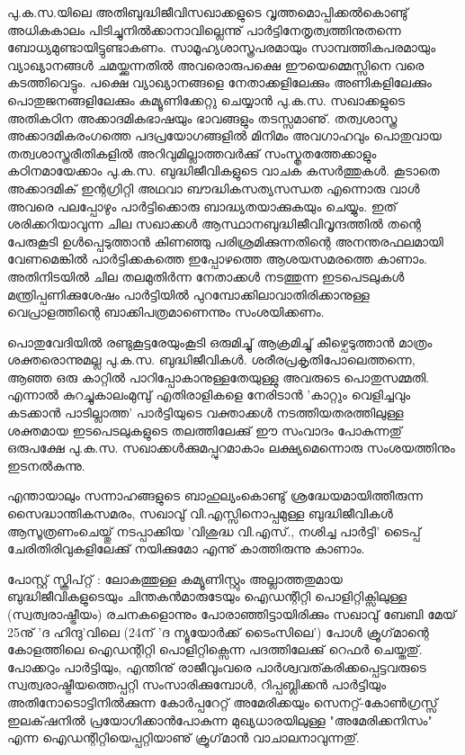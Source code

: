പു.ക.സ.യിലെ അതിബുദ്ധിജീവിസഖാക്കളുടെ വൃത്തമൊപ്പിക്കല്‍കൊണ്ടു് അധികകാലം പിടിച്ചുനില്‍ക്കാനാവില്ലെന്നു് 
പാര്‍ട്ടിനേതൃത്വത്തിനുതന്നെ ബോധ്യമുണ്ടായിട്ടുണ്ടാകണം. സാമൂഹ്യശാസ്ത്രപരമായും സാമ്പത്തികപരമായും 
വ്യാഖ്യാനങ്ങള്‍ ചമയ്ക്കുന്നതില്‍ അവരൊരുപക്ഷെ ഈയെമ്മെസ്സിനെ വരെ കടത്തിവെട്ടും. പക്ഷെ വ്യാഖ്യാനങ്ങളെ നേതാക്കളിലേക്കും 
അണികളിലേക്കും പൊതുജനങ്ങളിലേക്കും കമ്യൂണിക്കേറ്റു ചെയ്യാന്‍ പു.ക.സ. സഖാക്കളുടെ അതികഠിന അക്കാദമികഭാഷയും
ഭാവങ്ങളും തടസ്സമാണു്. തത്വശാസ്ത്ര അക്കാദമികരംഗത്തെ പദപ്രയോഗങ്ങളില്‍ മിനിമം അവഗാഹവും പൊതുവായ 
തത്വശാസ്ത്രരീതികളില്‍ അറിവുമില്ലാത്തവര്‍ക്കു് സംസ്കൃതത്തേക്കാളും കഠിനമായേക്കാം പു.ക.സ. ബുദ്ധിജീവികളുടെ വാചക
കസര്‍ത്തുകള്‍. കൂടാതെ അക്കാദമിക് ഇന്റഗ്രിറ്റി അഥവാ ബൗദ്ധികസത്യസന്ധത എന്നൊരു വാള്‍ അവരെ പലപ്പോഴും 
പാര്‍ട്ടിക്കൊരു ബാദ്ധ്യതയാക്കുകയും ചെയ്യും. ഇത് ശരിക്കറിയാവുന്ന ചില സഖാക്കള്‍ ആസ്ഥാനബുദ്ധിജീവിവൃന്ദത്തില്‍ 
തന്റെ പേരുകൂടി ഉള്‍പ്പെടുത്താന്‍ കിണഞ്ഞു പരിശ്രമിക്കുന്നതിന്റെ അനന്തരഫലമായി വേണമെങ്കില്‍ പാര്‍ട്ടിക്കകത്തെ ഇപ്പോഴത്തെ
ആശയസമരത്തെ കാണാം. അതിനിടയില്‍ ചില തലമുതിര്‍ന്ന നേതാക്കള്‍ നടത്തുന്ന ഇടപെടലുകള്‍ മന്ത്രിപ്പണിക്കുശേഷം
പാര്‍ട്ടിയില്‍ പുറമ്പോക്കിലാവാതിരിക്കാനുള്ള വെപ്രാളത്തിന്റെ ബാക്കിപത്രമാണെന്നും സംശയിക്കണം.

പൊതുവേദിയില്‍ രണ്ടുകൂട്ടരേയുംകൂടി ഒരുമിച്ചു് ആക്രമിച്ചു് കീഴ്പെടുത്താന്‍ മാത്രം ശക്തരൊന്നുമല്ല പു.ക.സ. ബുദ്ധിജീവികള്‍. 
ശരീരപ്രകൃതിപോലെത്തന്നെ, ആഞ്ഞ ഒരു കാറ്റില്‍ പാറിപ്പോകാനുള്ളതേയുള്ളു അവരുടെ പൊതുസമ്മതി. എന്നാല്‍ കുറച്ചുകാലംമുമ്പു് 
എതിരാളികളെ നേരിടാന്‍ 'കാറ്റും വെളിച്ചവും കടക്കാന്‍ പാടില്ലാത്ത' പാര്‍ട്ടിയുടെ വക്താക്കള്‍ 
നടത്തിയതരത്തിലുള്ള ശക്തമായ ഇടപെടലുകളുടെ തലത്തിലേക്കു് ഈ സംവാദം പോകുന്നതു് ഒരുപക്ഷേ പു.ക.സ. 
സഖാക്കള്‍ക്കുമപ്പുറമാകാം ലക്ഷ്യമെന്നൊരു സംശയത്തിനും ഇടനല്‍കുന്നു.

എന്തായാലും സന്നാഹങ്ങളുടെ ബാഹുല്യംകൊണ്ടു് ശ്രദ്ധേയമായിത്തീരുന്ന സൈദ്ധാന്തികസമരം, സഖാവു് വി.എസ്സിനൊപ്പമുള്ള 
ബുദ്ധിജീവികള്‍ ആസൂത്രണംചെയ്തു് നടപ്പാക്കിയ 'വിശുദ്ധ വി.എസ്., നശിച്ച പാര്‍ട്ടി' ടൈപ്പ് ചേരിതിരിവുകളിലേക്കു് 
നയിക്കുമോ എന്നു് കാത്തിരുന്നു കാണാം.

പോസ്റ്റ് സ്ക്രിപ്റ്റ് : ലോകത്തുള്ള കമ്യൂണിസ്റ്റും അല്ലാത്തതുമായ ബുദ്ധിജീവികളുടെയും ചിന്തകന്‍മാരുടേയും ഐഡന്റിറ്റി 
പൊളിറ്റിക്സിലുള്ള (സ്വത്വരാഷ്ട്രീയം) രചനകളൊന്നും പോരാഞ്ഞിട്ടായിരിക്കും സഖാവു് ബേബി മേയ് 25നു് 'ദ ഹിന്ദു'വിലെ 
(24ന് 'ദ ന്യൂയോര്‍ക്ക് ടൈംസിലെ') പോള്‍ ക്രൂഗ്‌മാന്റെ കോളത്തിലെ ഐഡന്റിറ്റി പൊളിറ്റിക്സെന്ന പദത്തിലേക്കു് 
റെഫര്‍ ചെയ്തതു്. പോക്കറും പാര്‍ട്ടിയും, എന്തിനു് രാജീവുംവരെ പാര്‍ശ്വവത്കരിക്കപ്പെട്ടവരുടെ സ്വത്വരാഷ്ട്രീയത്തെപ്പറ്റി 
സംസാരിക്കുമ്പോള്‍, റിപ്പബ്ലിക്കന്‍ പാര്‍ട്ടിയും അതിനോടൊട്ടിനില്‍ക്കുന്ന കോര്‍പ്പറേറ്റ് അമേരിക്കയും സെനറ്റ്-കോണ്‍ഗ്രസ്സ് ഇലക്‌ഷനില്‍ 
പ്രയോഗിക്കാന്‍പോകുന്ന മുഖ്യധാരയിലുള്ള "അമേരിക്കനിസം" എന്ന ഐഡന്റിറ്റിയെപ്പറ്റിയാണു് ക്രൂഗ്‌മാന്‍ വാചാലനാവുന്നതു്.

